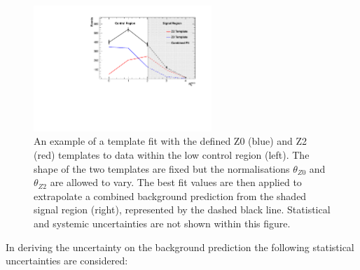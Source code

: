  \begin{figure}[!h]
 \centering
\includegraphics[width=0.60\textwidth]{plots/Template_Example.pdf}
\caption[An example of a template fit with the defined Z0 (blue) and Z2 (red) templates to data within the low \nbreco control region (left).]{An example of a template fit with the defined Z0 (blue) and Z2 (red) templates to data within the low \nbreco control region (left). The shape of the two templates are fixed but the normalisations $\theta_{Z0}$ and $\theta_{Z2}$ are allowed to vary. The best fit values are then applied to extrapolate a combined background prediction from the shaded signal region (right), represented by the dashed black line. Statistical and systemic uncertainties are not shown within this figure.}  
\label{fig:templateexample}
\end{figure}

In deriving the uncertainty on the background prediction the following statistical uncertainties are considered:

